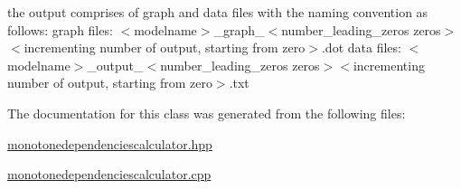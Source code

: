 the output comprises of graph and data files with the naming convention as follows\+: graph files\+: $<$modelname$>$\+\_\+graph\+\_\+$<$number\+\_\+leading\+\_\+zeros zeros$>$$<$incrementing number of output, starting from zero$>$.dot data files\+: $<$modelname$>$\+\_\+output\+\_\+$<$number\+\_\+leading\+\_\+zeros zeros$>$$<$incrementing number of output, starting from zero$>$.txt 

The documentation for this class was generated from the following files\+:\begin{DoxyCompactItemize}
\item 
\mbox{\hyperlink{monotonedependenciescalculator_8hpp}{monotonedependenciescalculator.\+hpp}}\item 
\mbox{\hyperlink{monotonedependenciescalculator_8cpp}{monotonedependenciescalculator.\+cpp}}\end{DoxyCompactItemize}
